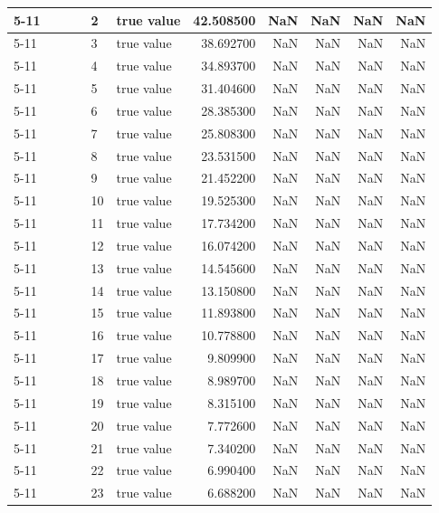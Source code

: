 \begin{tabular}{llllllrrrrr}
\cline{5-11}
 &  &  &  & 2 & true value & 42.508500 & NaN & NaN & NaN & NaN \\
\cline{5-11}
 &  &  &  & 3 & true value & 38.692700 & NaN & NaN & NaN & NaN \\
\cline{5-11}
 &  &  &  & 4 & true value & 34.893700 & NaN & NaN & NaN & NaN \\
\cline{5-11}
 &  &  &  & 5 & true value & 31.404600 & NaN & NaN & NaN & NaN \\
\cline{5-11}
 &  &  &  & 6 & true value & 28.385300 & NaN & NaN & NaN & NaN \\
\cline{5-11}
 &  &  &  & 7 & true value & 25.808300 & NaN & NaN & NaN & NaN \\
\cline{5-11}
 &  &  &  & 8 & true value & 23.531500 & NaN & NaN & NaN & NaN \\
\cline{5-11}
 &  &  &  & 9 & true value & 21.452200 & NaN & NaN & NaN & NaN \\
\cline{5-11}
 &  &  &  & 10 & true value & 19.525300 & NaN & NaN & NaN & NaN \\
\cline{5-11}
 &  &  &  & 11 & true value & 17.734200 & NaN & NaN & NaN & NaN \\
\cline{5-11}
 &  &  &  & 12 & true value & 16.074200 & NaN & NaN & NaN & NaN \\
\cline{5-11}
 &  &  &  & 13 & true value & 14.545600 & NaN & NaN & NaN & NaN \\
\cline{5-11}
 &  &  &  & 14 & true value & 13.150800 & NaN & NaN & NaN & NaN \\
\cline{5-11}
 &  &  &  & 15 & true value & 11.893800 & NaN & NaN & NaN & NaN \\
\cline{5-11}
 &  &  &  & 16 & true value & 10.778800 & NaN & NaN & NaN & NaN \\
\cline{5-11}
 &  &  &  & 17 & true value & 9.809900 & NaN & NaN & NaN & NaN \\
\cline{5-11}
 &  &  &  & 18 & true value & 8.989700 & NaN & NaN & NaN & NaN \\
\cline{5-11}
 &  &  &  & 19 & true value & 8.315100 & NaN & NaN & NaN & NaN \\
\cline{5-11}
 &  &  &  & 20 & true value & 7.772600 & NaN & NaN & NaN & NaN \\
\cline{5-11}
 &  &  &  & 21 & true value & 7.340200 & NaN & NaN & NaN & NaN \\
\cline{5-11}
 &  &  &  & 22 & true value & 6.990400 & NaN & NaN & NaN & NaN \\
\cline{5-11}
 &  &  &  & 23 & true value & 6.688200 & NaN & NaN & NaN & NaN \\

\end{tabular}
